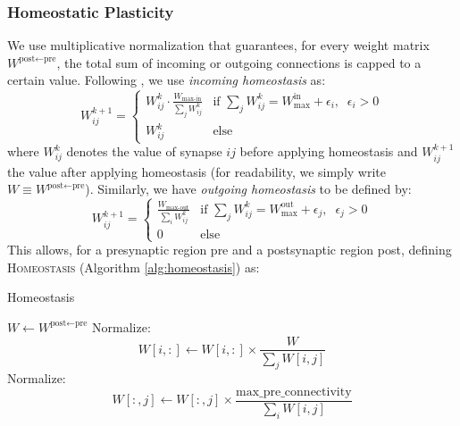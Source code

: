 \documentclass{article}
\begin{document}
\subsubsection*{Homeostatic Plasticity}
We use multiplicative normalization that guarantees, for every weight matrix $W^{\textrm{post}\leftarrow\textrm{pre}}$, the total sum of incoming or outgoing connections is capped to a certain value. Following , we use \textit{incoming homeostasis} as:
\begin{equation}
W_{ij}^{k+1}=
\begin{cases}
 W_{ij}^{k}\cdot\frac{W_\textrm{max-in}}{\sum_{j}W^{k}_{ij}} & \text{if }\sum_{j}W^{k}_{ij} = W_\textrm{max}^\textrm{in} + \epsilon_i, \;\; \epsilon_i > 0 \\[1.2ex]
W^k_{ij}& \textrm{else}
\end{cases}
\end{equation}
where $W^k_{ij}$ denotes the value of synapse $ij$ before applying homeostasis and $W^{k+1}_{ij}$ the value after applying homeostasis (for readability, we simply write $W \equiv W^{\textrm{post}\leftarrow\textrm{pre}}$).
Similarly, we have \textit{outgoing homeostasis} to be defined by:
\begin{equation}
W_{ij}^{k+1} =
\begin{cases}
 \frac{W_\textrm{max-out}}{\sum_{i}W^k_{ij}} & \text{if }\sum_{j}W^k_{ij} = W_\textrm{max}^\textrm{out} + \epsilon_j, \;\; \epsilon_j > 0 \\[1.2ex]
0 & \textrm{else}
\end{cases}
\end{equation}
This allows, for a presynaptic region pre and a postsynaptic region post, defining \textsc{Homeostasis} (Algorithm \ref{alg:homeostasis}) as:
\begin{algorithm}
\caption{Homeostasis}\label{alg:homeostasis}
\begin{algorithmic}[1]
\State $W \gets W^{\textrm{post}\leftarrow\textrm{pre}}$
            \State Normalize:
                \[
                W[i,:] \gets W[i,:] 
                \times
                \frac{W^\textrm{}}{\sum_j W[i,j]}
                \]
        \EndIf
    \EndFor
            \State Normalize:
                \[
                W[:,j] \gets W[:,j] 
                \times
                \frac{\text{max\_pre\_connectivity}}{\sum_i W[i,j]}
                \]
        \EndIf
    \EndFor
\EndFunction
\end{algorithmic}
\end{algorithm}
\end{document}
